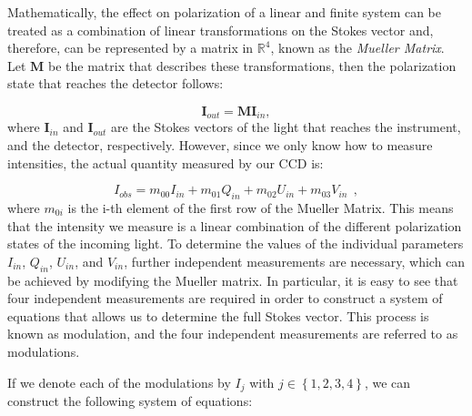 Mathematically, the effect on polarization of a linear and finite system can be treated as a combination of linear transformations on the Stokes vector and, therefore, can be represented by a matrix in $\mathbb{R}^4$, known as the \textit{Mueller Matrix}. Let $\textbf{M}$ be the matrix that describes these transformations, then the polarization state that reaches the detector follows:

\begin{equation}
  \textbf{I}_{out} = \textbf{M}\textbf{I}_{in},
  \label{eq_intro:modultaion_eqs}
\end{equation}
where $\textbf{I}_{in}$ and $\textbf{I}_{out}$ are the Stokes vectors of the light that reaches the instrument, and the detector, respectively. However, since we only know how to measure intensities, the actual quantity measured by our CCD is: 

\begin{equation}
  I_{obs} = m_{00}I_{in} + m_{01}Q_{in} + m_{02}U_{in} + m_{03}V_{in} \ \ ,
\end{equation}
where $m_{0i}$ is the i-th element of the first row of the Mueller Matrix. This means that the intensity we measure is a linear combination of the different polarization states of the incoming light. To determine the values of the individual parameters $I_{in}$, $Q_{in}$, $U_{in}$, and $V_{in}$, further independent measurements are necessary, which can be achieved by modifying the Mueller matrix. In particular, it is easy to see that four independent measurements are required in order to construct a system of equations that allows us to determine the full Stokes vector. This process is known as modulation, and the four independent measurements are referred to as modulations.

If we denote each of the modulations by $I _ j$ with $j \in \left\{ 1, 2, 3, 4\right\}$, we can construct the following system of equations:

